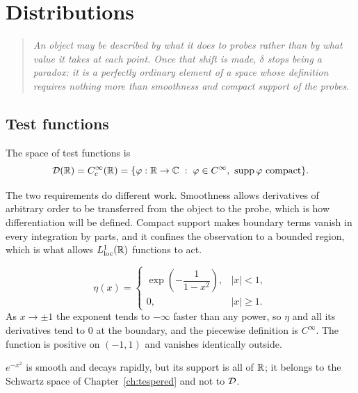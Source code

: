 \chapter{Distributions}
\label{ch:dist}

\begin{quote}
\itshape
An object may be described by what it does to probes rather than by what value it takes at each
point. Once that shift is made, $\delta$ stops being a paradox: it is a perfectly ordinary element of
a space whose definition requires nothing more than smoothness and compact support of the probes.
\end{quote}

\section{Test functions}

\begin{definition}\label{def:D}
The space of test functions is
\begin{equation}
\mathcal{D}(\mathbb{R})=C_{c}^{\infty}(\mathbb{R})=\{\varphi:\mathbb{R}\to\mathbb{C} \;:\; \varphi\in C^{\infty},\ \operatorname{supp}\varphi
\text{ compact}\}.
\end{equation}
\end{definition}

The two requirements do different work. Smoothness allows derivatives of arbitrary order to be
transferred from the object to the probe, which is how differentiation will be defined. Compact
support makes boundary terms vanish in every integration by parts, and it confines the observation to
a bounded region, which is what allows $L^{1}_{\mathrm{loc}}(\mathbb{R})$ functions to act.

\begin{example}\label{ex:bump}
\begin{equation}
\eta(x)=\begin{cases}\exp\!\left(-\dfrac{1}{1-x^{2}}\right),&|x|<1,\\[8pt] 0,&|x|\ge1 .\end{cases}
\end{equation}
As $x\to\pm1$ the exponent tends to $-\infty$ faster than any power, so $\eta$ and all its
derivatives tend to $0$ at the boundary, and the piecewise definition is $C^{\infty}$. The function
is positive on $(-1,1)$ and vanishes identically outside.
\end{example}

\begin{example}
$e^{-x^{2}}$ is smooth and decays rapidly, but its support is all of $\mathbb{R}$; it belongs to the Schwartz
space of Chapter~\ref{ch:tespered} and not to $\mathcal{D}$.
\end{example}

